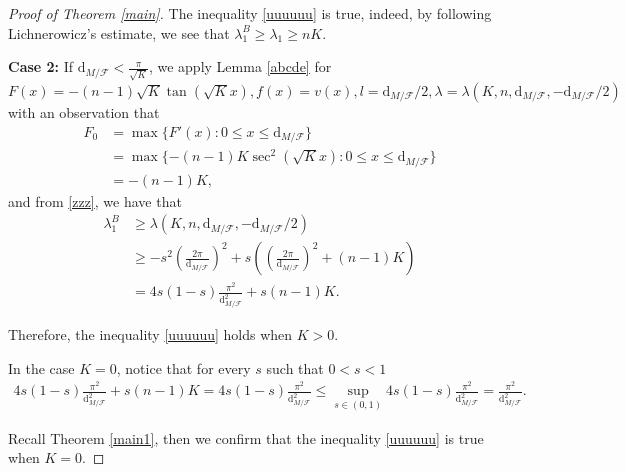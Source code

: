 \documentclass[11pt]{amsart}
\def\d{\mathrm{d}}
\begin{document}
\begin{proof}[Proof of Theorem \ref{main}]
The inequality \ref{uuuuuu} is true, indeed, by following Lichnerowicz's estimate, we see that $\lambda_1^B\geq\lambda_1\geq nK$.

\textbf{Case 2:} If $\d_{M/\mathcal{F}}<\frac{\pi}{\sqrt{K}}$, we apply Lemma \ref{abcde} for $F(x)=-(n-1)\sqrt{K}\tan(\sqrt{K}x), f(x)=v(x),l=\d_{M/\mathcal{F}}/2,\lambda=\lambda(K,n,\d_{M/\mathcal{F}},-\d_{M/\mathcal{F}}/2)$ with an observation that
\begin{align*}
    F_0&=\max\{F'(x):0\leq x \leq\d_{M/\mathcal{F}}\}\\&=\max\{-(n-1)K\sec^2(\sqrt{K}x):0\leq x \leq\d_{M/\mathcal{F}}\}\\&=-(n-1)K,
\end{align*} and from \ref{zzz}, we have that
\begin{align*}
    \lambda_1^B&\geq\lambda(K,n,\d_{M/\mathcal{F}},-\d_{M/\mathcal{F}}/2)\\&\geq -s^2\left(\frac{2\pi}{\d_{M/\mathcal{F}}}\right)^2+s\left(\left(\frac{2\pi}{\d_{M/\mathcal{F}}}\right)^2+(n-1)K\right)\\&=4s(1-s)\frac{\pi^2}{\d_{M/\mathcal{F}}^2}+s(n-1)K.
\end{align*}





Therefore, the inequality \ref{uuuuuu} holds when $K>0$.


In the case $K=0$, notice that for every $s$ such that $0<s<1$
\begin{align*}
    4s(1-s)\frac{\pi^2}{\d_{M/\mathcal{F}}^2}+s(n-1)K=4s(1-s)\frac{\pi^2}{\d_{M/\mathcal{F}}^2}\leq\sup_{s\in (0,1)}4s(1-s)\frac{\pi^2}{\d_{M/\mathcal{F}}^2}=\frac{\pi^2}{\d_{M/\mathcal{F}}^2}.
\end{align*}

Recall Theorem \ref{main1}, then we confirm that the inequality \ref{uuuuuu} is true when $K= 0$. 
\end{proof}
\end{document}
